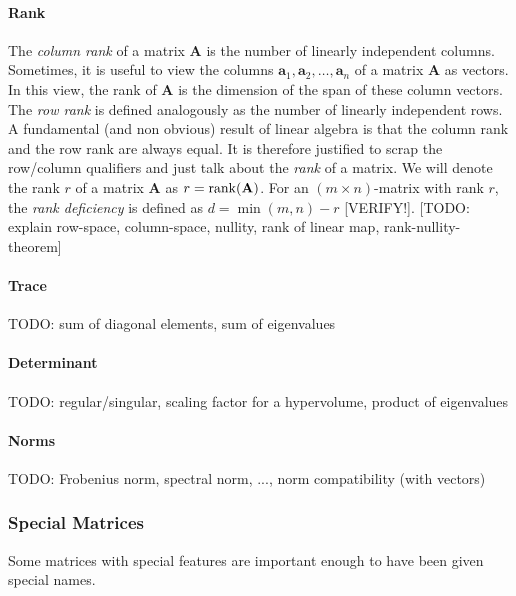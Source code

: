 \paragraph{Rank}
The \emph{column rank} of a matrix $\mathbf{A}$ is the number of linearly independent columns. Sometimes, it is useful to view the columns $\mathbf{a}_1, \mathbf{a}_2, \ldots, \mathbf{a}_n$ of a matrix $\mathbf{A}$ as vectors. In this view, the rank of $\mathbf{A}$ is the dimension of the span of these column vectors. The \emph{row rank} is defined analogously as the number of linearly independent rows. A fundamental (and non obvious) result of linear algebra is that the column rank and the row rank are always equal. It is therefore justified to scrap the row/column qualifiers and just talk about the \emph{rank} of a matrix. We will denote the rank $r$ of a matrix $\mathbf{A}$ as $r = \operatorname{rank}(\mathbf{A})$. For an $(m \times n)$-matrix with rank $r$, the \emph{rank deficiency} is defined as $d = \min(m,n) - r$ [VERIFY!]. [TODO: explain row-space, column-space, nullity, rank of linear map, rank-nullity-theorem]






\paragraph{Trace}
TODO: sum of diagonal elements, sum of eigenvalues


\paragraph{Determinant}
TODO: regular/singular, scaling factor for a hypervolume, product of eigenvalues

\paragraph{Norms}
TODO: Frobenius norm, spectral norm, ..., norm compatibility (with vectors)



\subsubsection{Special Matrices} %
Some matrices with special features are important enough to have been given special names.

